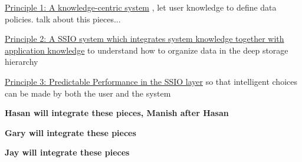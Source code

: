 \underline{Principle 1: A knowledge-centric system} , let user knowledge  to define data policies. talk about this pieces...

\underline{Principle 2: A SSIO system which integrates system knowledge together with application knowledge} to understand
how to organize data in the deep storage hierarchy

\underline{Principle 3: Predictable Performance in the SSIO layer} so that intelligent choices can be made by both the user and the system



%

%


%
{\bf {\color{red}Hasan will integrate these pieces, Manish after Hasan}}




%
%


{\bf {\color{red}Gary will integrate these pieces}}
%

%
{\bf {\color{red}Jay  will integrate these pieces}}

% 



